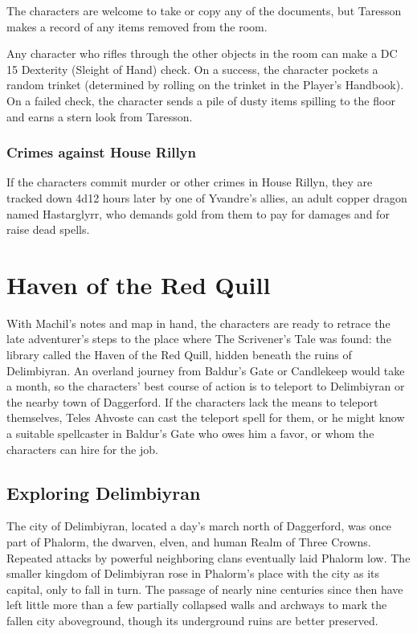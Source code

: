 \documentclass[10pt,a4paper,twoside,bg=print,twocolumn,openany,nodeprecatedcode]{dndbook}
\begin{document}
The characters are welcome to take or copy any of the documents, but Taresson makes a record of any items removed from the room.

Any character who rifles through the other objects in the room can make a DC 15 Dexterity (Sleight of Hand) check. On a success, the character pockets a random trinket (determined by rolling on the trinket in the Player's Handbook). On a failed check, the character sends a pile of dusty items spilling to the floor and earns a stern look from Taresson.

\subsubsection{Crimes against House Rillyn}
If the characters commit murder or other crimes in House Rillyn, they are tracked down 4d12 hours later by one of Yvandre's allies, an adult copper dragon named Hastarglyrr, who demands gold from them to pay for damages and for raise dead spells.

\section{Haven of the Red Quill}
With Machil's notes and map in hand, the characters are ready to retrace the late adventurer's steps to the place where The Scrivener's Tale was found: the library called the Haven of the Red Quill, hidden beneath the ruins of Delimbiyran. An overland journey from Baldur's Gate or Candlekeep would take a month, so the characters' best course of action is to teleport to Delimbiyran or the nearby town of Daggerford. If the characters lack the means to teleport themselves, Teles Ahvoste can cast the teleport spell for them, or he might know a suitable spellcaster in Baldur's Gate who owes him a favor, or whom the characters can hire for the job.

\subsection{Exploring Delimbiyran}
The city of Delimbiyran, located a day's march north of Daggerford, was once part of Phalorm, the dwarven, elven, and human Realm of Three Crowns. Repeated attacks by powerful neighboring clans eventually laid Phalorm low. The smaller kingdom of Delimbiyran rose in Phalorm's place with the city as its capital, only to fall in turn. The passage of nearly nine centuries since then have left little more than a few partially collapsed walls and archways to mark the fallen city aboveground, though its underground ruins are better preserved.
\end{document}
